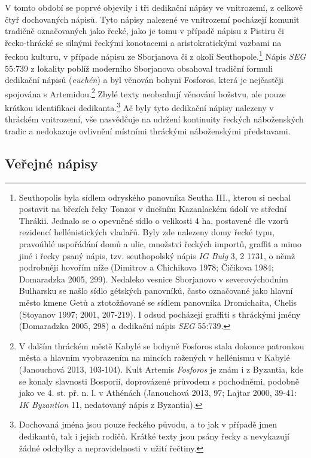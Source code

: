 V tomto období se poprvé objevily i tři dedikační nápisy ve vnitrozemí, z celkově čtyř dochovaných nápisů. Tyto nápisy nalezené ve vnitrozemí pocházejí komunit tradičně označovaných jako řecké, jako je tomu v případě nápisu z Pistiru či řecko-thrácké se silnými řeckými konotacemi a aristokratickými vazbami na řeckou kulturu, v případe nápisu ze Sborjanova či z okolí Seuthopole.\footnote{Seuthopolis byla sídlem odryského panovníka Seutha III., kterou si nechal postavit na březích řeky Tonzos v dnešním Kazanlackém údolí ve střední Thrákii. Jednalo se o opevněné sídlo o velikosti 4 ha, postavené dle vzorů rezidencí hellénistických vladařů. Byly zde nalezeny domy řecké typu, pravoúhlé uspořádání domů a ulic, množství řeckých importů, graffit a mimo jiné i řecky psaný nápis, tzv. seuthopolský nápis {\em IG Bulg} 3, 2 1731, o němž podrobněji hovořím níže (Dimitrov a Chichikova 1978; Čičikova 1984; Domaradzka 2005, 299). Nedaleko vesnice Sborjanovo v severovýchodním Bulharsku se našlo sídlo gétských panovníků, často označované jako hlavní město kmene Getů a ztotožňované se sídlem panovníka Dromichaita, Chelis (Stoyanov 1997; 2001, 207-219). I odsud pocházejí graffiti s thráckými jmény (Domaradzka 2005, 298) a dedikační nápis {\em SEG} 55:739.} Nápis {\em SEG} 55:739 z lokality poblíž moderního Sborjanova obsahoval tradiční formuli dedikační nápisů ({\em euchén}) a byl věnován bohyni Fosforos, která je nejčastěji spojována s Artemidou.\footnote{V dalším thráckém městě Kabylé se bohyně Fosforos stala dokonce patronkou města a hlavním vyobrazením na mincích ražených v hellénismu v Kabylé (Janouchová 2013, 103-104). Kult Artemis {\em Fosforos} je znám i z Byzantia, kde se konaly slavnosti Bosporií, doprovázené průvodem s pochodněmi, podobně jako ve 4. st. př. n. l. v Athénách (Janouchová 2013, 97; Lajtar 2000, 39-41: {\em IK Byzantion} 11, nedatovaný nápis z Byzantia).} Zbylé texty neobsahují věnování božstvu, ale pouze krátkou identifikaci dedikanta.\footnote{Dochovaná jména jsou pouze řeckého původu, a to jak v případě jmen dedikantů, tak i jejich rodičů. Krátké texty jsou psány řecky a nevykazují žádné odchylky a nepravidelnosti v užití řečtiny.} Ač byly tyto dedikační nápisy nalezeny v thráckém vnitrozemí, vše nasvědčuje na udržení kontinuity řeckých náboženských tradic a nedokazuje ovlivnění místními thráckými náboženskými představami.

\subsection[veřejné-nápisy-4]{Veřejné nápisy}


